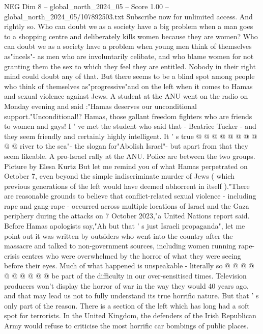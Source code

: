 \begin{textsample}{NEG Dim 8 – global\_north\_2024\_05 – Score 1.00 – global\_north\_2024\_05/107892503.txt}  \label{ex:f8_neg_385}
Subscribe now for unlimited access.
And rightly so.
Who can doubt we as a society have a big problem when a man goes to a shopping centre and deliberately kills women because they are women?
Who can doubt we as a society have a problem when young men think of themselves as"incels"- as men who are involuntarily celibate, and who blame women for not granting them the sex to which they feel they are entitled.
Nobody in their right mind could doubt any of that.
But there seems to be a blind spot among people who think of themselves as"progressive"and on the left when it comes to Hamas and sexual violence against Jews.
A student at the ANU went on the radio on Monday evening and said :"Hamas deserves our unconditional support."Unconditional!?
Hamas, those gallant freedom fighters who are friends to women and gays!
I ' ve met the student who said that - Beatrice Tucker - and they seem friendly and certainly highly intelligent.
It ' s true @ @ @ @ @ @ @ @ @ @ river to the sea"- the slogan for"Abolish Israel"- but apart from that they seem likeable.
A pro-Israel rally at the ANU.
Police are between the two groups.
Picture by Elesa Kurtz But let me remind you of what Hamas perpetrated on October 7, even beyond the simple indiscriminate murder of Jews ( which previous generations of the left would have deemed abhorrent in itself )."There are reasonable grounds to believe that conflict-related sexual violence - including rape and gang-rape - occurred across multiple locations of Israel and the Gaza periphery during the attacks on 7 October 2023,"a United Nations report said.
Before Hamas apologists say,"Ah but that ' s just Israeli propaganda", let me point out it was written by outsiders who went into the country after the massacre and talked to non-government sources, including women running rape-crisis centres who were overwhelmed by the horror of what they were seeing before their eyes.
Much of what happened is unspeakable - literally so @ @ @ @ @ @ @ @ @ @ be part of the difficulty in our over-sensitised times.
Television producers won't display the horror of war in the way they would 40 years ago, and that may lead us not to fully understand its true horrific nature.
But that ' s only part of the reason.
There is a section of the left which has long had a soft spot for terrorists.
In the United Kingdom, the defenders of the Irish Republican Army would refuse to criticise the most horrific car bombings of public places.

\end{textsample}
